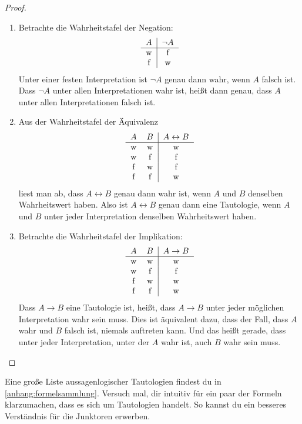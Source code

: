 \begin{proof}
    \begin{enumerate}
        \item Betrachte die Wahrheitstafel der Negation:
        \[\begin{tabular}{c|c}
            $A$ &  $\neg A$ \\
            \hline
            w&f\\
            f&w
        \end{tabular}\]
        Unter einer festen Interpretation ist $\neg A$ genau dann wahr, wenn $A$ falsch ist. Dass $\neg A$ unter allen Interpretationen wahr ist, heißt dann genau, dass $A$ unter allen Interpretationen falsch ist.
        \item Aus der Wahrheitstafel der Äquivalenz
        \[\begin{tabular}{cc|c}
            $A$ &  $B$ & $A \leftrightarrow B$ \\
            \hline
            w&w&w\\
            w&f&f \\
            f & w & f\\
            f & f & w
        \end{tabular}\]
        liest man ab, dass $A\leftrightarrow B$ genau dann wahr ist, wenn $A$ und $B$ denselben Wahrheitswert haben. Also ist $A\leftrightarrow B$ genau dann eine Tautologie, wenn $A$ und $B$ unter jeder Interpretation denselben Wahrheitswert haben.
        \item Betrachte die Wahrheitstafel der Implikation:
        \[\begin{tabular}{cc|c}
            $A$ &  $B$ & $A \to B$ \\
            \hline
            w&w&w\\
            w&f&f \\
            f & w & w\\
            f & f & w
        \end{tabular}\]
        Dass $A\to B$ eine Tautologie ist, heißt, dass $A\to B$ unter jeder möglichen Interpretation wahr sein muss. Dies ist äquivalent dazu, dass der Fall, dass $A$ wahr und $B$ falsch ist, niemals auftreten kann. Und das heißt gerade, dass unter jeder Interpretation, unter der $A$ wahr ist, auch $B$ wahr sein muss. \qedhere
    \end{enumerate}
\end{proof}
 

\begin{bem}
    Eine große Liste aussagenlogischer Tautologien findest du in \cref{anhang:formelsammlung}. Versuch mal, dir intuitiv für ein paar der Formeln klarzumachen, dass es sich um Tautologien handelt. So kannst du ein besseres Verständnis für die Junktoren erwerben.
\end{bem}


